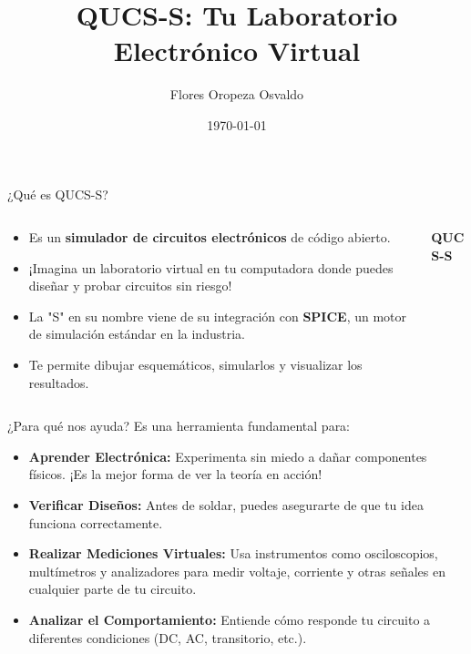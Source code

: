 \documentclass{beamer}
\title{QUCS-S: Tu Laboratorio Electrónico Virtual}
\author{Flores Oropeza Osvaldo}
\institute{UPIITA - IPN}
\date{\today}
\begin{document}
\begin{frame}
  \titlepage
\end{frame}

\begin{frame}{¿Qué es QUCS-S?}
  \begin{columns}
    \begin{column}{0.6\textwidth}
      \begin{itemize}
        \item Es un \textbf{simulador de circuitos electrónicos} de código abierto.
        \pause
        \item ¡Imagina un laboratorio virtual en tu computadora donde puedes diseñar y probar circuitos sin riesgo!
        \pause
        \item La "S" en su nombre viene de su integración con \textbf{SPICE}, un motor de simulación estándar en la industria.
        \pause
        \item Te permite dibujar esquemáticos, simularlos y visualizar los resultados.
      \end{itemize}
    \end{column}
    \begin{column}{0.4\textwidth}
        \centering
        \Huge \textbf{QUCS-S}
    \end{column}
  \end{columns}
\end{frame}

\begin{frame}{¿Para qué nos ayuda?}
  Es una herramienta fundamental para:
  \begin{itemize}
    \item \textbf{Aprender Electrónica:} Experimenta sin miedo a dañar componentes físicos. ¡Es la mejor forma de ver la teoría en acción!
    \pause
    \item \textbf{Verificar Diseños:} Antes de soldar, puedes asegurarte de que tu idea funciona correctamente.
    \pause
    \item \textbf{Realizar Mediciones Virtuales:} Usa instrumentos como osciloscopios, multímetros y analizadores para medir voltaje, corriente y otras señales en cualquier parte de tu circuito.
    \pause
    \item \textbf{Analizar el Comportamiento:} Entiende cómo responde tu circuito a diferentes condiciones (DC, AC, transitorio, etc.).
  \end{itemize}
\end{frame}
\end{document}
